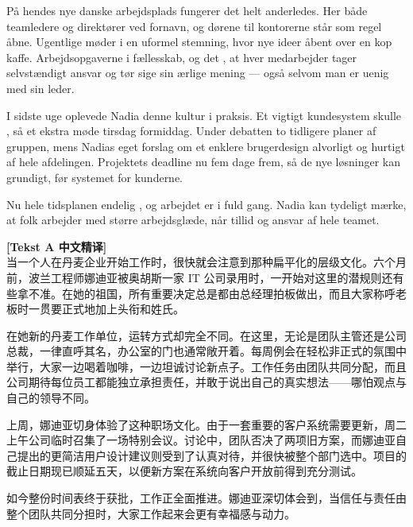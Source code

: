På hendes nye danske arbejdsplads fungerer det helt anderledes. Her  både teamledere og direktører ved fornavn, og dørene til kontorerne står som regel åbne. Ugentlige møder  i en uformel stemning, hvor nye ideer  åbent over en kop kaffe. Arbejdsopgaverne  i fællesskab, og det , at hver medarbejder tager selvstændigt ansvar og tør sige sin ærlige mening --- også selvom man er uenig med sin leder.

I sidste uge oplevede Nadia denne kultur i praksis. Et vigtigt kundesystem skulle , så et ekstra møde  tirsdag formiddag. Under debatten  to tidligere planer  af gruppen, mens Nadias eget forslag om et enklere brugerdesign  alvorligt og hurtigt  af hele afdelingen. Projektets deadline  nu  fem dage frem, så de nye løsninger kan  grundigt, før systemet  for kunderne.

Nu  hele tidsplanen endelig , og arbejdet er i fuld gang. Nadia kan tydeligt mærke, at folk arbejder med større arbejdsglæde, når tillid og ansvar  af hele teamet.

\begin{transbox}
\small
\textbf{\color{NCDTeal}[Tekst A 中文精译]}\\
当一个人在丹麦企业开始工作时，很快就会注意到那种扁平化的层级文化。六个月前，波兰工程师娜迪亚被奥胡斯一家 IT 公司录用时，一开始对这里的潜规则还有些拿不准。在她的祖国，所有重要决定总是都由总经理拍板做出，而且大家称呼老板时一贯要正式地加上头衔和姓氏。

在她新的丹麦工作单位，运转方式却完全不同。在这里，无论是团队主管还是公司总裁，一律直呼其名，办公室的门也通常敞开着。每周例会在轻松非正式的氛围中举行，大家一边喝着咖啡，一边坦诚讨论新点子。工作任务由团队共同分配，而且公司期待每位员工都能独立承担责任，并敢于说出自己的真实想法——哪怕观点与自己的领导不同。

上周，娜迪亚切身体验了这种职场文化。由于一套重要的客户系统需要更新，周二上午公司临时召集了一场特别会议。讨论中，团队否决了两项旧方案，而娜迪亚自己提出的更简洁用户设计建议则受到了认真对待，并很快被整个部门选中。项目的截止日期现已顺延五天，以便新方案在系统向客户开放前得到充分测试。

如今整份时间表终于获批，工作正全面推进。娜迪亚深切体会到，当信任与责任由整个团队共同分担时，大家工作起来会更有幸福感与动力。
\end{transbox}

